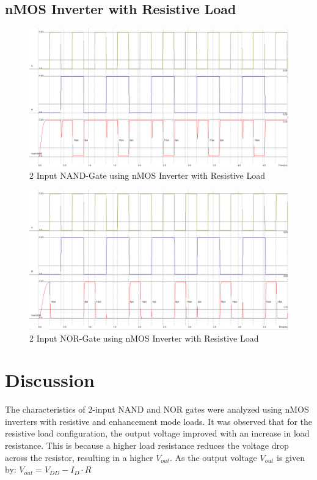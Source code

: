 \documentclass[a4paper,12pt]{article}
\begin{document}
\subsection{nMOS Inverter with Resistive Load}
	\begin{figure}[H]
		\centering
		\includegraphics[width=1\linewidth, height=.41\textheight]{Images5/3.1}
		\caption{2 Input NAND-Gate using nMOS Inverter with Resistive Load}
		\label{fig:1}
	\end{figure}
	\begin{figure}[H]
		\centering
		\includegraphics[width=1\linewidth, height=.41\textheight]{Images5/4.1}
		\caption{2 Input NOR-Gate using nMOS Inverter with Resistive Load}
		\label{fig:1}
	\end{figure}
	
	
	
	
	
	\section{Discussion }

	
	The characteristics of 2-input NAND and NOR gates were analyzed using nMOS inverters with resistive and enhancement mode loads. It was observed that for the resistive load configuration, the output voltage improved with an increase in load resistance. This is because a higher load resistance reduces the voltage drop across the resistor, resulting in a higher \( V_{out} \). 
	As the output voltage \( V_{out} \) is given by: $V_{out} = V_{DD} - I_{D} \cdot R$
	
\end{document}
